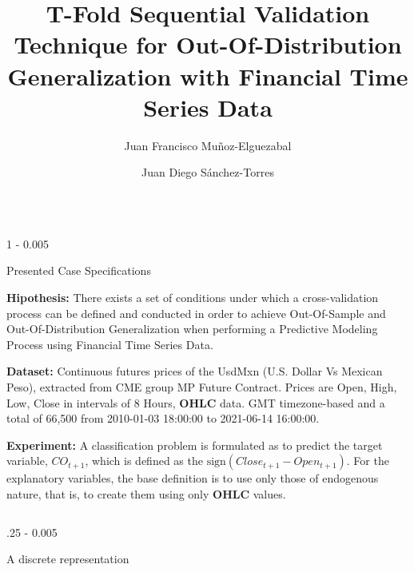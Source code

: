 \documentclass{postertheme}\usepackage[]{graphicx}\usepackage[]{color}
\title{T-Fold Sequential Validation Technique for Out-Of-Distribution Generalization with Financial
       Time Series Data}
\author {Juan Francisco Muñoz-Elguezabal \inst{1} \and Juan Diego Sánchez-Torres \inst{1}}
\institute {\inst{1} Western Institute of Technology and Higher Education (ITESO)}
\begin{document}
\begin{frame}


\begin{columns}[onlytextwidth]
  
  \begin{column}{1 \textwidth - 0.005 \textwidth}
    \begin{block}{Presented Case Specifications} \footnotesize

    \textbf{Hipothesis:}
      There exists a set of conditions under which a cross-validation process can be defined and conducted in
      order to achieve Out-Of-Sample and Out-Of-Distribution Generalization when performing a Predictive
      Modeling Process using Financial Time Series Data.
      
    \textbf{Dataset:}
      Continuous futures prices of the UsdMxn (U.S. Dollar Vs Mexican Peso),
      extracted from CME group MP Future Contract. Prices are Open, High, Low, Close
      in intervals of 8 Hours, \textbf{OHLC} data. GMT timezone-based and a total of 66,500 
      from 2010-01-03 18:00:00 to 2021-06-14 16:00:00.
    
    \textbf{Experiment:}
      A classification problem is formulated as to predict the target variable, $CO_{t+1}$, which is defined
      as the $\text{sign}(Close_{t+1} - Open_{t+1})$. For the explanatory variables, the base definition is to
      use only those of endogenous nature, that is, to create them using only \textbf{OHLC} values.
  
    \end{block}
  \end{column}
\end{columns}


\begin{columns}[onlytextwidth]
  
  \begin{column}{.25 \textwidth - 0.005 \textwidth}
    \begin{block}{A discrete representation} \footnotesize
    

\end{block}
\end{column}
\end{columns}
\end{frame}
\end{document}
